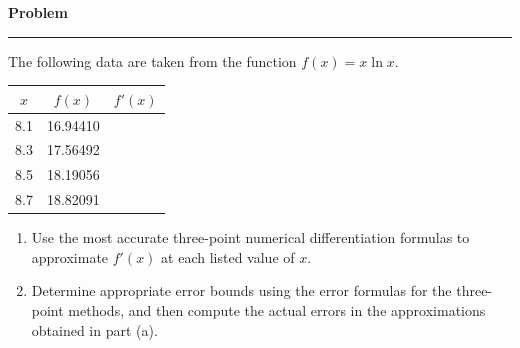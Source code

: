 \documentclass[11pt, a4paper]{article}
\newenvironment{problem}{%
  \begin{tcolorbox}[
    colback=blue!4!white,
    colframe=blue!38!black,
    boxrule=0.95pt,
    arc=3pt,
    left=11pt,
    right=11pt,
    top=10pt,
    bottom=11pt,
    before skip=12pt,
    after skip=14pt,
  ]
  \noindent\textbf{\textcolor{blue!35!black}{Problem}}\par\nointerlineskip
  {\color{blue!42!black}\rule{\linewidth}{0.55pt}}\par\vspace{0.55em}%
}{%
  \end{tcolorbox}%
}
\begin{document}
\begin{problem}
    The following data are taken from the function $f(x) = x \ln x$.
    
    \begin{center}
    \begin{tabular}{c | c | c}
    $x$ & $f(x)$ & $f'(x)$ \\
    \hline
    8.1 & 16.94410 & \\
    8.3 & 17.56492 & \\
    8.5 & 18.19056 & \\
    8.7 & 18.82091 &
    \end{tabular}
    \end{center}
    
    \begin{enumerate}[label=(\alph*)]
        \item Use the most accurate three-point numerical differentiation formulas to approximate $f'(x)$ at each listed value of $x$.
        \item Determine appropriate error bounds using the error formulas for the three-point methods, and then compute the actual errors in the approximations obtained in part (a).
    \end{enumerate}
    \end{problem}
    
\end{document}
